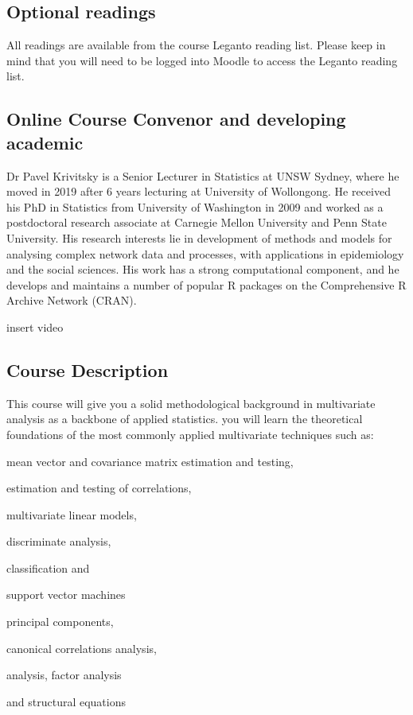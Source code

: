 \documentclass[11pt]{article}
\begin{document}
\subsection{Optional readings}\label{subsec:optional-readings}
All readings are available from the course Leganto reading list.
Please keep in mind that you will need to be logged into Moodle to access the Leganto reading list.

\subsection{Online Course Convenor and developing academic}\label{subsec:online-course-convenor-and-developing-academic}
Dr Pavel Krivitsky is a Senior Lecturer in Statistics at UNSW Sydney, where he moved in 2019 after 6 years lecturing at University of Wollongong.
He received his PhD in Statistics from University of Washington in 2009 and worked as a postdoctoral research associate at Carnegie Mellon University and Penn State University.
His research interests lie in development of methods and models for analysing complex network data and processes, with applications in epidemiology and the social sciences.
His work has a strong computational component, and he develops and maintains a number of popular R packages on the Comprehensive R Archive Network (CRAN).

  insert video

\subsection{Course Description}
This course will give you a solid methodological background in multivariate
analysis as a backbone of applied statistics.
you will learn the theoretical foundations of the most commonly applied
multivariate techniques such as:

\begin{description}
  \item mean vector and covariance matrix estimation and testing,
  \item estimation and testing of correlations,
  \item multivariate linear models,
  \item discriminate analysis,
  \item classification and
  \item support vector machines
  \item principal components,
  \item canonical correlations analysis,
  \item analysis, factor analysis
  \item and structural equations
\end{description}
\end{document}
